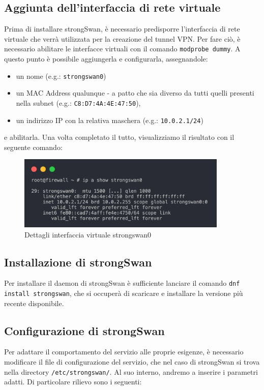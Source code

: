 \subsection{Aggiunta dell'interfaccia di rete virtuale}
Prima di installare strongSwan, è necessario predisporre l'interfaccia di rete virtuale che verrà utilizzata per la creazione del tunnel VPN. Per fare ciò, è necessario abilitare le interfacce virtuali con il comando \texttt{modprobe dummy}.
A questo punto è possibile aggiungerla e configurarla, assegnandole:
\begin{itemize}
    \item un nome (e.g.: \texttt{strongswan0})
    \item un MAC Address qualunque - a patto che sia diverso da tutti quelli presenti nella subnet (e.g.: \texttt{C8:D7:4A:4E:47:50}),
    \item un indirizzo IP con la relativa maschera (e.g.: \texttt{10.0.2.1/24})
\end{itemize}
e abilitarla.
Una volta completato il tutto, visualizziamo il risultato con il seguente comando:
\begin{figure}[ht]
    \centering
    \includegraphics[width=10cm]{figure/show_sw0.png}
    \caption{Dettagli interfaccia virtuale strongswan0}
\end{figure}

\subsection{Installazione di strongSwan}
Per installare il daemon di strongSwan è sufficiente lanciare il comando \texttt{dnf install strongswan}, che si occuperà di scaricare e installare la versione più recente disponibile.

\subsection{Configurazione di strongSwan}
Per adattare il comportamento del servizio alle proprie esigenze, è necessario modificare il file di configurazione del servizio, che nel caso di strongSwan si trova nella directory \texttt{/etc/strongswan/}.
Al suo interno, andremo a inserire i parametri adatti. Di particolare rilievo sono i seguenti:

